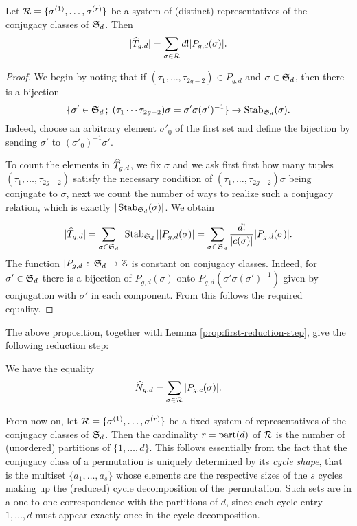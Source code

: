 \begin{prop}
 Let $\mathcal{R}=\{\sigma^{(1)},\dotsc,\sigma^{(r)}\}$ be a system of (distinct) representatives of the conjugacy classes of $\operatorname{\mathfrak{S}}_d$. Then \[|\widehat{T}_{g,d}|=\sum_{\sigma\in\mathcal{R}}d!|P_{g,d}(\sigma)|.\]
\end{prop}
\begin{proof}
 We begin by noting that if $(\tau_1,\dotsc,\tau_{2g-2})\in P_{g,d}$ and $\sigma\in\operatorname{\mathfrak{S}}_d$, then there is a bijection
 \[
  \{\sigma'\in\operatorname{\mathfrak{S}}_d\,;\; (\tau_1 \dotsm \tau_{2g-2})\sigma=\sigma'\sigma(\sigma')^{-1}\} \to
  \operatorname{Stab}_{\operatorname{\mathfrak{S}}_d}(\sigma).
 \]
 Indeed, choose an arbitrary element $\sigma'_0$ of the first set and define the bijection by sending $\sigma'$ to $(\sigma'_0)^{-1}\sigma'$.
 
 To count the elements in $\widehat{T}_{g,d}$, we fix $\sigma$ and we ask first first how many tuples $(\tau_1,\dotsc,\tau_{2g-2})$ satisfy the necessary condition of $(\tau_1,\dotsc,\tau_{2g-2})\sigma$ being conjugate to $\sigma$, next we count the number of ways to realize such a conjugacy relation, which is exactly $|\operatorname{Stab}_{\operatorname{\mathfrak{S}}_d}(\sigma)|$. We obtain
 
 \[
  |\widehat{T}_{g,d}|=\sum_{\sigma\in\operatorname{\mathfrak{S}}_d}|\operatorname{Stab}_{\operatorname{\mathfrak{S}}_d}||P_{g,d}(\sigma)|=\sum_{\sigma\in\operatorname{\mathfrak{S}}_d}\frac{d!}{|c(\sigma)|}|P_{g,d}(\sigma)|.
 \]
The function $|P_{g,d}|\colon\operatorname{\mathfrak{S}}_d\to\mathbb{Z}$ is constant on conjugacy classes. Indeed, for $\sigma'\in\operatorname{\mathfrak{S}}_d$ there is a bijection of $P_{g,d}(\sigma)$ onto $P_{g,d}(\sigma'\sigma(\sigma')^{-1})$ given by conjugation with $\sigma'$ in each component. From this follows the required equality.
\end{proof}
The above proposition, together with Lemma \ref{prop:first-reduction-step}, give the following reduction step:
\begin{cor} \label{prop:first-second-reduction-step}
  We have the equality
 \[
  \widehat{N}_{g,d}=\sum_{\sigma\in\mathcal{R}}|P_{g,c}(\sigma)|.
 \]
\end{cor}

From now on, let $\mathcal{R}=\{\sigma^{(1)},\dotsc,\sigma^{(r)}\}$ be a fixed system of representatives of the conjugacy classes of $\operatorname{\mathfrak{S}}_d$. Then the cardinality $r=\operatorname{part}(d)$ of $\mathcal{R}$ is the number of (unordered) partitions of $\{1,\dotsc,d\}$. This follows essentially from the fact that the conjugacy class of a permutation is uniquely determined by its \emph{cycle shape}, that is the multiset $\{a_{1},\dotsc,a_{s}\}$ whose elements are the respective sizes of the $s$ cycles making up the (reduced) cycle decomposition of the permutation. Such sets are in a one-to-one correspondence with the partitions of $d$, since each cycle entry $1,\dotsc,d$ must appear exactly once in the cycle decomposition.


